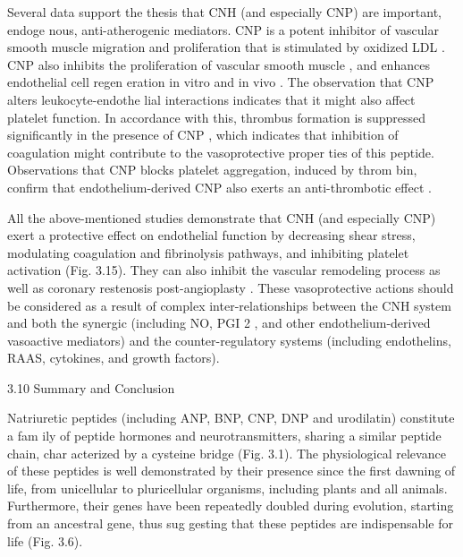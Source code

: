 \documentclass[14pt,a4paper,onecolumn]{extarticle}
\begin{document}
Several data support the thesis that CNH (and especially CNP) are important, endoge nous, anti-atherogenic mediators. CNP is a potent inhibitor of vascular smooth muscle migration and proliferation that is stimulated by oxidized LDL \citep{277}. CNP also inhibits the proliferation of vascular smooth muscle \citep{284}, and enhances endothelial cell regen eration in vitro and in vivo \citep{281}. The observation that CNP alters leukocyte-endothe lial interactions indicates that it might also affect platelet function. In accordance with this, thrombus formation is suppressed significantly in the presence of CNP \citep{280}, which indicates that inhibition of coagulation might contribute to the vasoprotective proper ties of this peptide. Observations that CNP blocks platelet aggregation, induced by throm bin, confirm that endothelium-derived CNP also exerts an anti-thrombotic effect \citep{267}.

All the above-mentioned studies demonstrate that CNH (and especially CNP) exert a protective effect on endothelial function by decreasing shear stress, modulating coagulation and fibrinolysis pathways, and inhibiting platelet activation (Fig. 3.15). They can also inhibit the vascular remodeling process as well as coronary restenosis post-angioplasty \citep{56}\citep{84-89}\citep{267}\citep{281}\citep{283}. These vasoprotective actions should be considered as a result of complex inter-relationships between the CNH system and both the synergic (including NO, PGI 2 , and other endothelium-derived vasoactive mediators) and the counter-regulatory systems (including endothelins, RAAS, cytokines, and growth factors).

3.10 Summary and Conclusion

Natriuretic peptides (including ANP, BNP, CNP, DNP and urodilatin) constitute a fam ily of peptide hormones and neurotransmitters, sharing a similar peptide chain, char acterized by a cysteine bridge (Fig. 3.1). The physiological relevance of these peptides is well demonstrated by their presence since the first dawning of life, from unicellular to pluricellular organisms, including plants and all animals. Furthermore, their genes have been repeatedly doubled during evolution, starting from an ancestral gene, thus sug gesting that these peptides are indispensable for life (Fig. 3.6).
\end{document}
